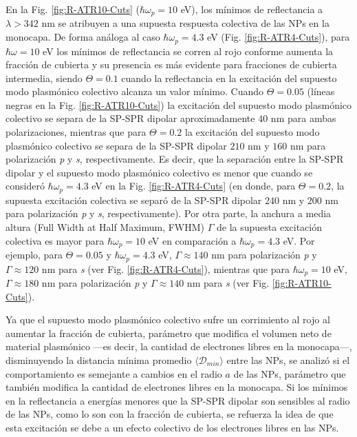 En la Fig. \ref{fig:R-ATR10-Cuts} ($\hbar\omega_p=10$ eV), los mínimos de reflectancia a $\lambda > 342$ nm se atribuyen a una supuesta respuesta colectiva de las NPs en la monocapa. De forma análoga al caso $\hbar\omega_p = 4.3$ eV (Fig. \ref{fig:R-ATR4-Cuts}), para $\hbar\omega=10$ eV los mínimos de reflectancia se corren al rojo conforme aumenta la fracción de cubierta y su presencia es más evidente para fracciones de cubierta intermedia, siendo  $\Theta=0.1$ cuando la reflectancia en la excitación del supuesto modo plasmónico colectivo alcanza un valor mínimo. Cuando $\Theta = 0.05$ (líneas negras en la Fig. \ref{fig:R-ATR10-Cuts}) la excitación del supuesto modo plasmónico colectivo se separa de la SP-SPR dipolar  aproximadamente $40$ nm para ambas polarizaciones, mientras que para $\Theta = 0.2$ la excitación del supuesto modo plasmónico colectivo se separa de la SP-SPR dipolar  $210$ nm y $160$ nm para polarización \emph{p} y \emph{s}, respectivamente. Es decir, que la separación entre la SP-SPR dipolar y el supuesto modo plasmónico colectivo es menor que cuando se consideró $\hbar\omega_p = 4.3$ eV en la Fig. \ref{fig:R-ATR4-Cuts} (en donde, para $\Theta=0.2$, la supuesta excitación colectiva se separó de la SP-SPR dipolar $240$ nm y $200$ nm para polarización \emph{p} y \emph{s}, respectivamente). Por otra parte, la anchura a media altura (Full Width at Half Maximum, FWHM) $\Gamma$ de la supuesta excitación colectiva es mayor para $\hbar\omega_p=10$ eV en comparación a $\hbar\omega_p=4.3$ eV. Por ejemplo, para $\Theta = 0.05$ y $\hbar\omega_p = 4.3$ eV,  $\Gamma\approx 140$ nm para polarización \emph{p} y  $\Gamma\approx 120$ nm para  \emph{s} (ver Fig. \ref{fig:R-ATR4-Cuts}), mientras que para  $\hbar\omega_p = 10$ eV,  $\Gamma\approx 180$ nm para polarización \emph{p} y  $\Gamma\approx 140$ nm para  \emph{s} (ver Fig. \ref{fig:R-ATR10-Cuts}).

Ya que el supuesto modo plasmónico colectivo sufre un corrimiento al rojo al aumentar la fracción de cubierta, parámetro que modifica el volumen neto de material plasmónico ---es decir, la cantidad de electrones libres en la monocapa---, disminuyendo la distancia mínima promedio $\langle\mathscr{D}_{min}\rangle$ entre las NPs, se analizó si el comportamiento es semejante a cambios en el radio $a$ de las NPs, parámetro que también modifica la cantidad de electrones libres en la monocapa. Si  los mínimos en la reflectancia  a energías menores que la SP-SPR dipolar son sensibles al radio de las NPs, como lo son con la fracción de cubierta, se refuerza la idea de que esta excitación se debe a un efecto colectivo de los electrones libres en las NPs.
 
